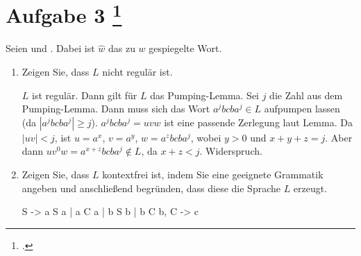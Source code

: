 \documentclass{lehramt-informatik-aufgabe}
\begin{document}
\section{Aufgabe 3
\footcite{66115:2020:09}}

Seien  und .
Dabei ist $\hat{w}$ das zu $w$ gespiegelte Wort.

\begin{enumerate}


\item Zeigen Sie, dass $L$ nicht regulär ist.

\begin{liExkurs}
\liPumpingRegulaer
\end{liExkurs}

\begin{liAntwort}
$L$ ist regulär.
Dann gilt für $L$ das Pumping-Lemma.
Sei $j$ die Zahl aus
dem Pumping-Lemma.
Dann muss sich das Wort $a^j b c b a^j \in L$
aufpumpen lassen (da $|a^j b c b a^j| \geq j$).
$a^j b c b a^j = uvw$ ist eine passende Zerlegung laut Lemma.
Da $|uv| < j$, ist
$u = a^x$, $v = a^y$, $w = a^z b c b a^j$, wobei
$y > 0$ und
$x + y + z = j$.
Aber dann
$u v^0 w= a^{x+z} b c b a^j \notin L$, da $x + z < j$.
Widerspruch.
\end{liAntwort}


\item Zeigen Sie, dass $L$ kontextfrei ist, indem Sie eine geeignete
Grammatik angeben und anschließend begründen, dass diese die Sprache $L$
erzeugt.

\begin{liAntwort}
\begin{liProduktionsRegeln}
S -> a S a | a C a | b S b | b C b,
C -> c
\end{liProduktionsRegeln}



\end{liAntwort}

\end{enumerate}
\end{document}
